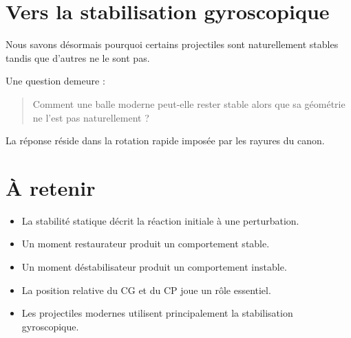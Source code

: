 \section{Vers la stabilisation gyroscopique}

Nous savons désormais pourquoi certains projectiles sont naturellement
stables tandis que d'autres ne le sont pas.

Une question demeure :

\begin{quote}
Comment une balle moderne peut-elle rester stable alors que sa géométrie ne
l'est pas naturellement ?
\end{quote}

La réponse réside dans la rotation rapide imposée par les rayures du canon.

\section{À retenir}

\begin{aretenir}

\begin{itemize}
    \item La stabilité statique décrit la réaction initiale à une
          perturbation.
    \item Un moment restaurateur produit un comportement stable.
    \item Un moment déstabilisateur produit un comportement instable.
    \item La position relative du CG et du CP joue un rôle essentiel.
    \item Les projectiles modernes utilisent principalement la stabilisation
          gyroscopique.
\end{itemize}

\end{aretenir}
